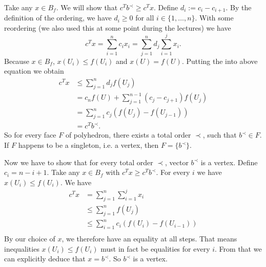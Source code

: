 \begin{exercise}{3}
    Take any $x \in B_f$.
    We will show that $c^T b^\prec \geq c^T x$.
    Define $d_i := c_i - c_{i+1}$. By the definition of the ordering, we
    have $d_i \geq 0$ for all $i \in \{1, \dots, n\}$. With some reordering
    (we also used this at some point during the lectures) we have
    \begin{equation*}
        c^T x = \sum^n_{i=1} c_i x_i = \sum^n_{j=1} d_j \sum^j_{i=1} x_i.
    \end{equation*}
    Because $x \in B_f$, $x(U_i) \leq f(U_i)$ and $x(U) = f(U)$. Putting the
    into above equation we obtain
    \begin{equation*}
        \begin{split}
            c^T x &\leq \sum^n_{j=1} d_j f(U_j) \\
            &= c_n f(U) + \sum^{n-1}_{j=1} (c_j - c_{j+1}) f(U_j) \\
            &= \sum^n_{j=1} c_j (f(U_{j}) - f(U_{j-1})) \\
            &= c^T b^\prec.
        \end{split}
    \end{equation*}
    So for every face $F$ of polyhedron, there exists a total order $\prec$,
    such that $b^\prec \in F$. If $F$ happens to be a singleton, i.e. a vertex,
    then $F = \{b^\prec\}$.

    Now we have to show that for every total order $\prec$, vector $b^\prec$ is
    a vertex. Define $c_i = n - i + 1$. Take any $x \in B_f$ with $c^T x \geq
    c^T b^\prec$.
    For every $i$ we have $x(U_i) \leq f(U_i)$.
    We have
    \begin{equation*}
        \begin{split}
            c^T x &= \sum^n_{j=1} \sum^j_{i=1} x_i \\
            &\leq \sum^n_{j=1} f(U_j) \\
            &\leq \sum^n_{i=1} c_i (f(U_i) - f(U_{i-1})) \\
        \end{split}
    \end{equation*}
    By our choice of $x$, we therefore have an equality at all steps. 
    That means inequalities $x(U_i) \leq f(U_i)$ must in fact be equalities for
    every $i$. From that we can explicitly deduce that $x = b^\prec$. So
    $b^\prec$ is a vertex.
\end{exercise}


